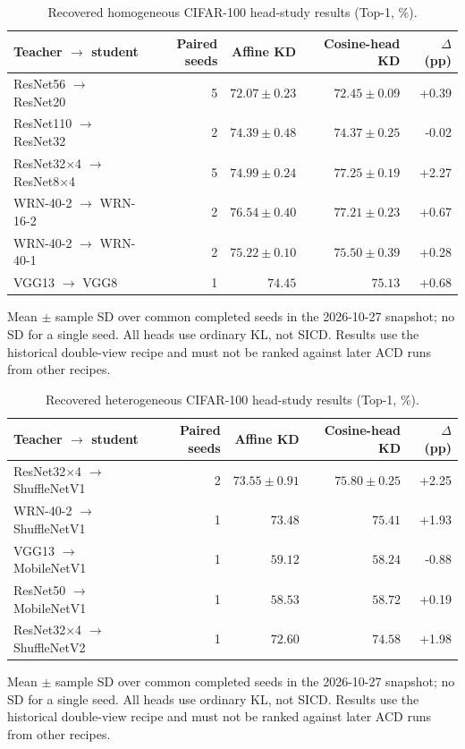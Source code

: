 \begin{table}[t]
\centering\small
\caption{Recovered homogeneous CIFAR-100 head-study results (Top-1, \%).}
\label{tab:historical_homogeneous}
\begin{tabular}{lrrrr}
\toprule
Teacher $\to$ student & Paired seeds & Affine KD & Cosine-head KD & $\Delta$ (pp) \\
\midrule
ResNet56 $\to$ ResNet20 & 5 & $72.07\pm0.23$ & $72.45\pm0.09$ & +0.39 \\
ResNet110 $\to$ ResNet32 & 2 & $74.39\pm0.48$ & $74.37\pm0.25$ & -0.02 \\
ResNet32$\times$4 $\to$ ResNet8$\times$4 & 5 & $74.99\pm0.24$ & $77.25\pm0.19$ & +2.27 \\
WRN-40-2 $\to$ WRN-16-2 & 2 & $76.54\pm0.40$ & $77.21\pm0.23$ & +0.67 \\
WRN-40-2 $\to$ WRN-40-1 & 2 & $75.22\pm0.10$ & $75.50\pm0.39$ & +0.28 \\
VGG13 $\to$ VGG8 & 1 & $74.45$ & $75.13$ & +0.68 \\
\bottomrule
\end{tabular}
\par\smallskip\begin{minipage}{0.95\textwidth}\footnotesize
Mean $\pm$ sample SD over common completed seeds in the 2026-10-27 snapshot; no SD for a single seed. All heads use ordinary KL, not SICD. Results use the historical double-view recipe and must not be ranked against later ACD runs from other recipes.
\end{minipage}
\end{table}

\begin{table}[t]
\centering\small
\caption{Recovered heterogeneous CIFAR-100 head-study results (Top-1, \%).}
\label{tab:historical_heterogeneous}
\begin{tabular}{lrrrr}
\toprule
Teacher $\to$ student & Paired seeds & Affine KD & Cosine-head KD & $\Delta$ (pp) \\
\midrule
ResNet32$\times$4 $\to$ ShuffleNetV1 & 2 & $73.55\pm0.91$ & $75.80\pm0.25$ & +2.25 \\
WRN-40-2 $\to$ ShuffleNetV1 & 1 & $73.48$ & $75.41$ & +1.93 \\
VGG13 $\to$ MobileNetV1 & 1 & $59.12$ & $58.24$ & -0.88 \\
ResNet50 $\to$ MobileNetV1 & 1 & $58.53$ & $58.72$ & +0.19 \\
ResNet32$\times$4 $\to$ ShuffleNetV2 & 1 & $72.60$ & $74.58$ & +1.98 \\
\bottomrule
\end{tabular}
\par\smallskip\begin{minipage}{0.95\textwidth}\footnotesize
Mean $\pm$ sample SD over common completed seeds in the 2026-10-27 snapshot; no SD for a single seed. All heads use ordinary KL, not SICD. Results use the historical double-view recipe and must not be ranked against later ACD runs from other recipes.
\end{minipage}
\end{table}

